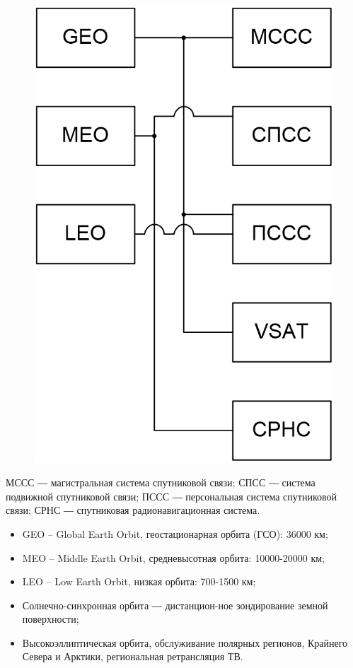 \documentclass[14pt,a4paper,oneside]{extarticle}
\begin{document}
\begin{figure}[H]
    \begin{center}
        \includegraphics[width=\textwidth/2]{imgs/2}
    \end{center}
\end{figure}

МССС ― магистральная система спутниковой связи; СПСС ―
система подвижной спутниковой связи; ПССС ― персональная система спутниковой связи; СРНС ― спутниковая радионавигационная система.

\begin{itemize}
    \item GEO – Global Earth Orbit, геостационарная орбита (ГСО): 36000 км;
    \item MEO – Middle Earth Orbit, средневысотная орбита: 10000-20000 км;
    \item LEO – Low Earth Orbit, низкая орбита: 700-1500 км;
    \item Солнечно-синхронная орбита ― дистанцион-ное зондирование земной поверхности;
    \item Высокоэллиптическая орбита, обслуживание полярных регионов, Крайнего Севера и Арктики, региональная ретрансляция ТВ.
\end{itemize}
\end{document}
